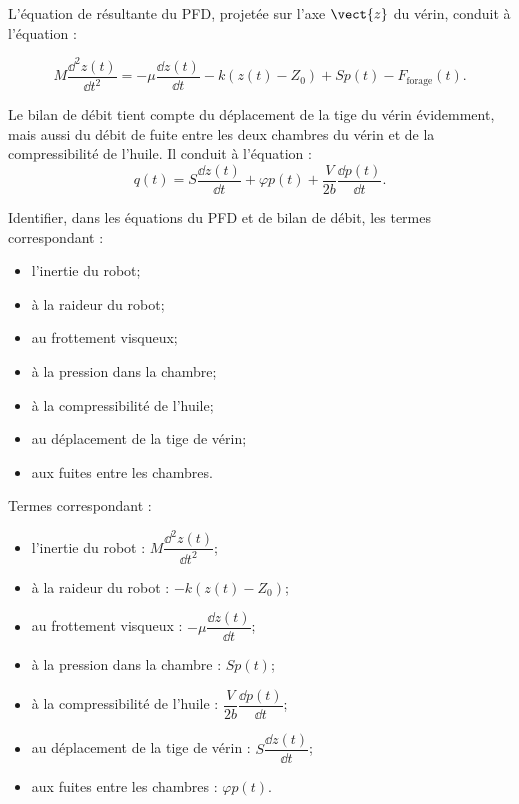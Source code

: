 L’équation de résultante du PFD, projetée sur l’axe $\vect{z}$ du vérin, conduit à l’équation :

$$
M\dfrac{\dd^2 z(t)}{\dd t^2} = -\mu \dfrac{\dd z (t)}{\dd t} - k\left( z(t) - Z_0\right) +Sp(t)-F_{\text{forage}}(t).
$$

Le bilan de débit tient compte du déplacement de la tige du vérin évidemment, mais aussi du
débit de fuite entre les deux chambres du vérin et de la compressibilité de l’huile. Il conduit à
l’équation :
$$
q(t)=S \dfrac{\dd z (t)}{\dd t} +\varphi p(t) + \dfrac{V}{2b}  \dfrac{\dd p(t)}{\dd t}.
$$





\begin{question}Identifier, dans les équations du PFD et de bilan de débit, les termes correspondant :
\begin{multicols}{2}
\begin{itemize}
\item l’inertie du robot;
\item à la raideur du robot;
\item au frottement visqueux;
\item à la pression dans la chambre;
\item à la compressibilité de l’huile;
\item au déplacement de la tige de vérin;
\item aux fuites entre les chambres.
\end{itemize}
\end{multicols}
\end{question}

\ifprof
\begin{corrige}
Termes correspondant :
\begin{itemize}
\item  l’inertie du robot : $M\dfrac{\dd^2 z(t)}{\dd t^2}$;
\item à la raideur du robot : $ - k\left( z(t) - Z_0\right)$;
\item  au frottement visqueux : $ -\mu \dfrac{\dd z (t)}{\dd t}$;
\item  à la pression dans la chambre : $Sp(t)$;
\item  à la compressibilité de l’huile : $ \dfrac{V}{2b}  \dfrac{\dd p(t)}{\dd t}$;
\item  au déplacement de la tige de vérin : $ S \dfrac{\dd z (t)}{\dd t}$;
\item aux fuites entre les chambres : $\varphi p(t) $.
\end{itemize}
\end{corrige}
\else
\fi

